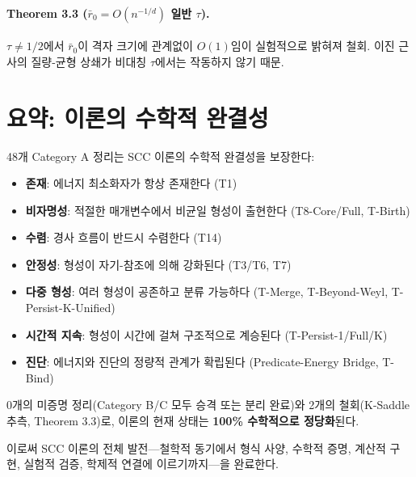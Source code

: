 \paragraph{Theorem 3.3 ($\bar{r}_0 = O(n^{-1/d})$ 일반 $\tau$).} $\tau \neq 1/2$에서 $\bar{r}_0$이 격자 크기에 관계없이 $O(1)$임이 실험적으로 밝혀져 철회. 이진 근사의 질량-균형 상쇄가 비대칭 $\tau$에서는 작동하지 않기 때문.


\section{요약: 이론의 수학적 완결성}
\label{sec:ch15-summary}

48개 Category A 정리는 SCC 이론의 수학적 완결성을 보장한다:

\begin{itemize}
    \item \textbf{존재}: 에너지 최소화자가 항상 존재한다 (T1)
    \item \textbf{비자명성}: 적절한 매개변수에서 비균일 형성이 출현한다 (T8-Core/Full, T-Birth)
    \item \textbf{수렴}: 경사 흐름이 반드시 수렴한다 (T14)
    \item \textbf{안정성}: 형성이 자기-참조에 의해 강화된다 (T3/T6, T7)
    \item \textbf{다중 형성}: 여러 형성이 공존하고 분류 가능하다 (T-Merge, T-Beyond-Weyl, T-Persist-K-Unified)
    \item \textbf{시간적 지속}: 형성이 시간에 걸쳐 구조적으로 계승된다 (T-Persist-1/Full/K)
    \item \textbf{진단}: 에너지와 진단의 정량적 관계가 확립된다 (Predicate-Energy Bridge, T-Bind)
\end{itemize}

0개의 미증명 정리(Category B/C 모두 승격 또는 분리 완료)와 2개의 철회(K-Saddle 추측, Theorem 3.3)로, 이론의 현재 상태는 \textbf{100\% 수학적으로 정당화}된다.

이로써 SCC 이론의 전체 발전---철학적 동기에서 형식 사양, 수학적 증명, 계산적 구현, 실험적 검증, 학제적 연결에 이르기까지---을 완료한다.
